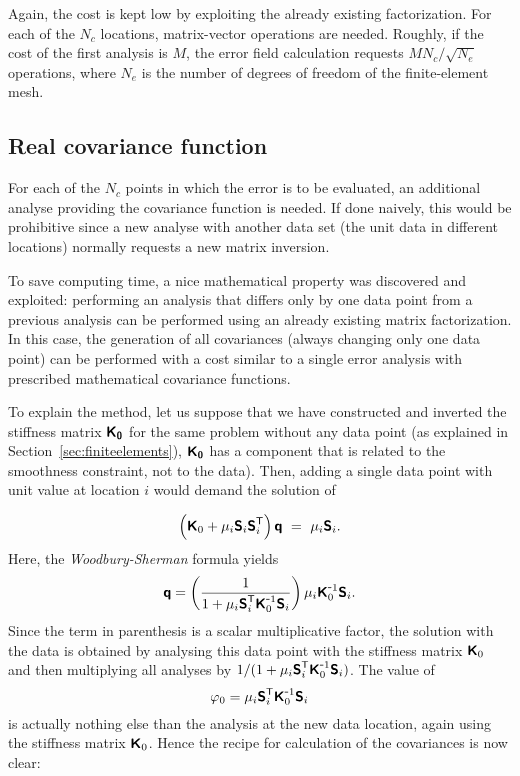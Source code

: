 Again, the cost is kept low by exploiting the already existing factorization. For each of the $N_c$ locations, matrix-vector operations are needed. Roughly, if the cost of the first analysis is $M$, the error field calculation requests $M N_c/\sqrt{N_e}$ operations, where $N_e$ is the number of degrees of freedom of the finite-element mesh.

\subsection{Real covariance function}

For each of the $N_c$ points in which the error is to be evaluated, an additional analyse providing the covariance function is needed. If done naively, this would be prohibitive since a new analyse with another data set (the unit data in different locations) normally requests a new matrix inversion. 

To save computing time, a nice mathematical property was discovered and exploited: performing an analysis that differs only by one data point from a previous analysis can be performed using an already existing matrix factorization. In this case, the generation of all covariances (always changing only one data point) can be performed with a cost similar to a single error analysis with prescribed mathematical covariance functions.

To explain the method, let us suppose that we have constructed and inverted the stiffness matrix $\mbox{\boldmath $ \protect\mathsf{K_0} $}$ for the same problem without any data point (as explained in Section~\ref{sec:finiteelements}), $\mbox{\boldmath $ \protect\mathsf{K_0} $}$ has a component that is related to the smoothness constraint, not to the data). Then, adding a single data point with unit value at location $i$ would demand the solution of 

\begin{equation}
\left( \mbox{\boldmath $ \protect\mathsf{K} $}_0 + \mu_i \mbox{\boldmath $ \protect\mathsf{S} $}_i {\mbox{\boldmath $ \protect\mathsf{S} $}}^\mathsf{T}_i \right) \mbox{\boldmath $ \protect\mathsf{q} $} ~=~ \mu_i \mbox{\boldmath $ \protect\mathsf{S} $}_i.
\end{equation}
Here, the \textit{Woodbury-Sherman} formula yields
\begin{equation}
\mbox{\boldmath $ \protect\mathsf{q} $}=\left( 1 \over 1 + \mu_i {\mbox{\boldmath $ \protect\mathsf{S} $}}^\mathsf{T}_i {\mbox{\boldmath $ \protect\mathsf{K} $}}^{ \mbox{\small{-}} 1}_0 \mbox{\boldmath $ \protect\mathsf{S} $}_i \right) \mu_i {\mbox{\boldmath $ \protect\mathsf{K} $}}^{ \mbox{\small{-}} 1}_0 \mbox{\boldmath $ \protect\mathsf{S} $}_i.
\label{eq:qwoodone}
\end{equation}
Since the term in parenthesis is a scalar multiplicative factor, the solution with the data is obtained by analysing this data point with the stiffness matrix $\mbox{\boldmath $ \protect\mathsf{K} $}_0$ and then multiplying all analyses by $ 1 /( 1 + \mu_i {\mbox{\boldmath $ \protect\mathsf{S} $}}^\mathsf{T}_i {\mbox{\boldmath $ \protect\mathsf{K} $}}^{ \mbox{\small{-}} 1}_0 \mbox{\boldmath $ \protect\mathsf{S} $}_i)$.
The value of 
\begin{equation} 
\varphi_0 = \mu_i {\mbox{\boldmath $ \protect\mathsf{S} $}}^\mathsf{T}_i {\mbox{\boldmath $ \protect\mathsf{K} $}}^{ \mbox{\small{-}} 1}_0 \mbox{\boldmath $ \protect\mathsf{S} $}_i
\end{equation}
is actually nothing else than the analysis at the new data location, again using the stiffness matrix $\mbox{\boldmath $ \protect\mathsf{K} $}_0$.
Hence the recipe for calculation of the covariances is now clear: 

